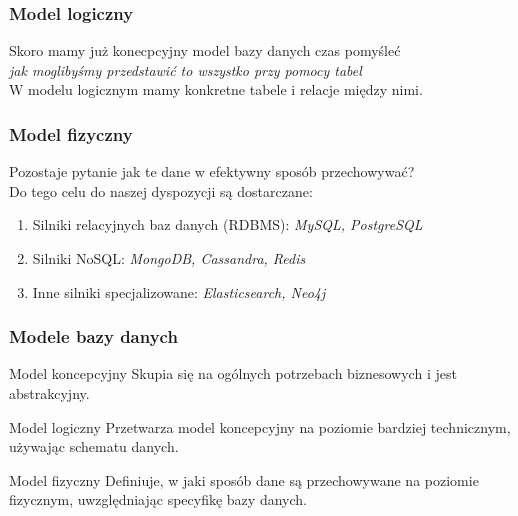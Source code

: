 \documentclass{beamer}
\begin{document}
\begin{frame}
    \frametitle{Model logiczny}
    Skoro mamy już konecpcyjny model bazy danych czas pomyśleć\\ 
    \textit{jak moglibyśmy przedstawić to wszystko przy pomocy tabel}\\
    W modelu logicznym mamy konkretne tabele i relacje między nimi.
\end{frame}

\begin{frame}
    \frametitle{Model fizyczny}
    Pozostaje pytanie jak te dane w efektywny sposób przechowywać?\\
    Do tego celu do naszej dyspozycji są dostarczane:
    \begin{enumerate}
    \item Silniki relacyjnych baz danych (RDBMS): \textit{MySQL, PostgreSQL}
    \item Silniki NoSQL: \textit{MongoDB, Cassandra, Redis}
    \item Inne silniki specjalizowane: \textit{Elasticsearch, Neo4j}
    \end{enumerate}
\end{frame}

\begin{frame}
    \frametitle{Modele bazy danych}
    \begin{block}{Model koncepcyjny}
        Skupia się na ogólnych potrzebach biznesowych i jest abstrakcyjny.
    \end{block}
    \begin{block}{Model logiczny}
        Przetwarza model koncepcyjny na poziomie bardziej technicznym, używając schematu danych.
    \end{block}
    \begin{block}{Model fizyczny}
        Definiuje, w jaki sposób dane są przechowywane na poziomie fizycznym, uwzględniając specyfikę bazy danych.
    \end{block}
\end{frame}
\end{document}
